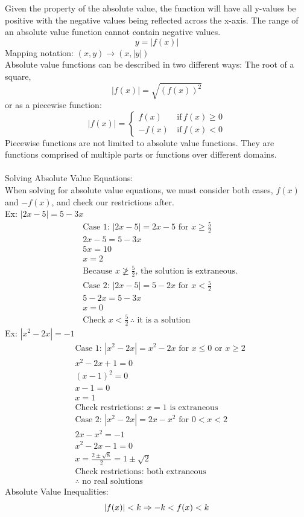 \documentclass[11pt, fleqn]{article}
\begin{document}
Given the property of the absolute value, the function will have all y-values be positive with the negative values being reflected across the x-axis. The range of an absolute value function cannot contain negative values.
$$y=|f(x)|$$
Mapping notation: $(x,y)\rightarrow(x,|y|)$\\
Absolute value functions can be described in two different ways: The root of a square, $$|f(x)|=\sqrt{(f(x))^2}$$
or as a piecewise function:
$$|f(x)|=\left\{\begin{matrix} f(x)\,&\mathrm{if}\,f(x)\geq 0\\ -f(x)\,&\mathrm{if}\,f(x)<0\end{matrix}\right.$$
Piecewise functions are not limited to absolute value functions. They are functions comprised of multiple parts or functions over different domains.\\
\\
Solving Absolute Value Equations:\\
When solving for absolute value equations, we must consider both cases, $f(x)$ and $-f(x)$, and check our restrictions after.\\
Ex: $|2x-5|=5-3x$
\begin{align*}
    &\text{Case 1: } |2x-5|=2x-5\text{ for }x\geq\frac{5}{2}\\
    &2x-5=5-3x\\
    &5x=10\\
    &x=2\\
    &\text{Because }x\ngeq\frac{5}{2}\text{, the solution is extraneous.}\\
    &\text{Case 2: } |2x-5|=5-2x\text{ for }x<\frac{5}{2}\\
    &5-2x=5-3x\\
    &x=0\\
    &\text{Check }x<\frac{5}{2}\,\therefore\text{ it is a solution}
\end{align*}
Ex: $|x^2-2x|=-1$
\begin{align*}
    &\text{Case 1: }|x^2-2x|=x^2-2x\text{ for }x\leq 0\text{ or }x\geq 2\\
    &x^2-2x+1=0\\
    &(x-1)^2=0\\
    &x-1=0\\
    &x=1\\
    &\text{Check restrictions: }x=1\text{ is extraneous}\\
    &\text{Case 2: }|x^2-2x|=2x-x^2\text{ for }0<x<2\\
    &2x-x^2=-1\\
    &x^2-2x-1=0\\
    &x=\frac{2\pm\sqrt{8}}{2}=1\pm\sqrt{2}\\
    &\text{Check restrictions: both extraneous}\\
    &\therefore\text{ no real solutions}
\end{align*}
Absolute Value Inequalities:\\
$$|f(x)|<k\Rightarrow-k<f(x)<k$$
\end{document}
